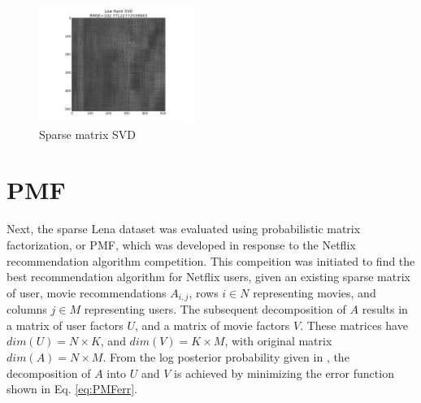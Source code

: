 \documentclass[journal]{IEEEtran}
\begin{document}
\begin{figure}[h!]
\centering
    \includegraphics[width=0.45\textwidth]{sparsesvd.png}
    \caption{Sparse matrix SVD}
    \label{fig:sparseSVD}
\end{figure}

\section{PMF}
Next, the sparse Lena dataset was evaluated using probabilistic matrix factorization, or PMF, which was developed in response to the Netflix
recommendation algorithm competition. This compeition was initiated to find the best recommendation algorithm for Netflix users, 
given an existing sparse matrix of user, movie recommendations \begin{math}A_{i,j}\end{math}, rows \begin{math}i \in N\end{math} representing movies, 
and columns \begin{math}j \in M\end{math}
representing users. The subsequent decomposition of \begin{math}A\end{math} results in a matrix of user factors \begin{math}U\end{math}, and a matrix of
movie factors \begin{math}V\end{math}. These matrices have \begin{math}dim(U) = N \times K \end{math}, and \begin{math}dim(V) = K \times M\end{math},
with original matrix \begin{math}dim(A) = N \times M\end{math}. From the log posterior probability given in \cite{PMFpaper}, the decomposition of
\begin{math}A\end{math} into \begin{math}U\end{math} and \begin{math}V\end{math} is achieved by minimizing the error function shown in Eq. \ref{eq:PMFerr}.
\end{document}
